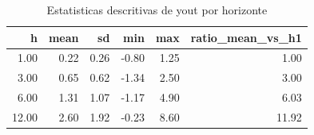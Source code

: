 \begin{table}[ht]
\centering
\begin{tabular}{rrrrrr}
  \hline
h & mean & sd & min & max & ratio\_mean\_vs\_h1 \\ 
  \hline
1.00 & 0.22 & 0.26 & -0.80 & 1.25 & 1.00 \\ 
  3.00 & 0.65 & 0.62 & -1.34 & 2.50 & 3.00 \\ 
  6.00 & 1.31 & 1.07 & -1.17 & 4.90 & 6.03 \\ 
  12.00 & 2.60 & 1.92 & -0.23 & 8.60 & 11.92 \\ 
   \hline
\end{tabular}
\caption{Estatisticas descritivas de yout por horizonte} 
\label{tab:audit_yout_stats}
\end{table}
